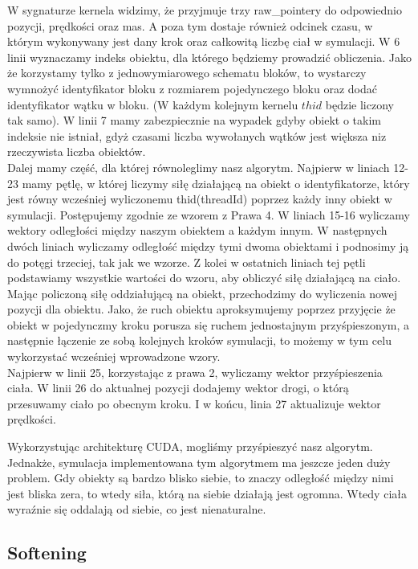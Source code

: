 \documentclass[14pt,twoside,a4paper]{article}
\theoremstyle{definition}
\begin{document}
W sygnaturze kernela widzimy, że przyjmuje trzy raw\_pointery do odpowiednio pozycji, prędkości oraz mas. A poza tym dostaje również  odcinek czasu, w którym wykonywany jest dany krok oraz całkowitą liczbę ciał w symulacji. W 6 linii wyznaczamy indeks obiektu, dla którego będziemy prowadzić obliczenia. Jako że korzystamy tylko z jednowymiarowego schematu bloków, to wystarczy wymnożyć identyfikator bloku z rozmiarem pojedynczego bloku oraz dodać identyfikator wątku w bloku. (W każdym kolejnym kernelu $thid$ będzie liczony tak samo).
W linii 7 mamy zabezpiecznie na wypadek gdyby obiekt o takim indeksie nie istniał, gdyż czasami liczba wywołanych wątków jest większa niz rzeczywista liczba obiektów. \\
\bigskip
Dalej mamy część, dla której równoleglimy nasz algorytm. Najpierw w liniach 12-23 mamy pętlę, w której liczymy siłę działającą na obiekt o identyfikatorze, który jest równy wcześniej wyliczonemu thid(threadId) poprzez każdy inny obiekt w symulacji. Postępujemy zgodnie ze wzorem z Prawa 4. W liniach 15-16 wyliczamy wektory odległości między naszym obiektem a każdym innym. W następnych dwóch liniach wyliczamy odległość między tymi dwoma obiektami i podnosimy ją do potęgi trzeciej, tak jak we wzorze. Z kolei w ostatnich liniach tej pętli podstawiamy wszystkie wartości do wzoru, aby obliczyć siłę działającą na ciało. \\
\bigskip
Mając policzoną siłę oddziałującą na obiekt, przechodzimy do wyliczenia nowej pozycji dla obiektu. Jako, że ruch obiektu aproksymujemy poprzez przyjęcie że obiekt w pojedynczmy kroku porusza się ruchem jednostajnym przyśpieszonym, a następnie łączenie ze sobą kolejnych kroków symulacji, to możemy w tym celu wykorzystać wcześniej wprowadzone wzory.\\ Najpierw w linii 25, korzystając z prawa 2, wyliczamy wektor przyśpieszenia ciała. W linii 26 do aktualnej pozycji dodajemy wektor drogi, o którą przesuwamy ciało po obecnym kroku. I w końcu, linia 27 aktualizuje wektor prędkości.
\bigskip

Wykorzystując architekturę CUDA, mogliśmy przyśpieszyć nasz algorytm. Jednakże, symulacja implementowana tym algorytmem ma jeszcze jeden duży problem. Gdy obiekty są bardzo blisko siebie, to znaczy odległość między nimi jest bliska zera, to wtedy siła, którą na siebie działają jest ogromna. Wtedy ciała wyraźnie się oddalają od siebie, co jest nienaturalne.

\subsection{\Large Softening} 
\end{document}
